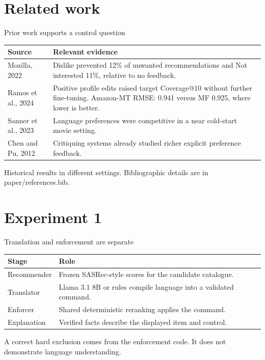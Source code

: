 \documentclass[10pt]{beamer}
\newcommand{\toprule}{\hline}
\newcommand{\midrule}{\hline}
\newcommand{\bottomrule}{\hline}
\newcommand{\src}[1]{\vfill{\tiny\color{bcitgray}#1}}
\begin{document}
\section{Related work}
\begin{frame}{Prior work supports a control question}
\small
\begin{tabular}{@{}P{2.1cm}P{8.0cm}@{}}
\toprule
Source & Relevant evidence\\\midrule
Mozilla, 2022 & Dislike prevented 12\% of unwanted recommendations and Not interested 11\%, relative to no feedback.\\[0.15cm]
Ramos et al., 2024 & Positive profile edits raised target Coverage@10 without further fine-tuning. Amazon-MT RMSE: 0.941 versus MF 0.925, where lower is better.\\[0.15cm]
Sanner et al., 2023 & Language preferences were competitive in a near cold-start movie setting.\\[0.15cm]
Chen and Pu, 2012 & Critiquing systems already studied richer explicit preference feedback.\\\bottomrule
\end{tabular}\par
\src{Historical results in different settings. Bibliographic details are in paper/references.bib.}
\end{frame}

\section{Experiment 1}
\begin{frame}{Translation and enforcement are separate}
\begin{tabular}{@{}P{2.2cm}P{7.9cm}@{}}
\toprule
Stage & Role\\\midrule
Recommender & Frozen SASRec-style scores for the candidate catalogue.\\[0.18cm]
Translator & Llama 3.1 8B or rules compile language into a validated command.\\[0.18cm]
Enforcer & Shared deterministic reranking applies the command.\\[0.18cm]
Explanation & Verified facts describe the displayed item and control.\\\bottomrule
\end{tabular}\par
\vspace{0.35cm}
A correct hard exclusion comes from the enforcement code. It does not demonstrate language understanding.
\end{frame}
\end{document}
